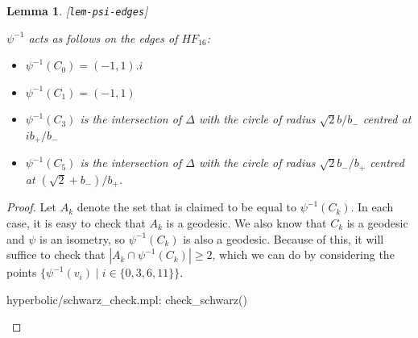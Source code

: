 \documentclass[reqno]{amsart}
\newcommand{\lbl}[1]{\label{#1}\textup{[\texttt{#1}]}\par}
\newcommand{\lbl}{\label}
\newcommand{\Dl}        {\Delta}
\newcommand{\st}        {\;|\;}
\newcommand{\rt}        {\sqrt{2}}
\renewcommand{\:}{\colon}
\newtheorem{lemma}[theorem]{Lemma}
\theoremstyle{definition}
\begin{document}
\begin{lemma}\lbl{lem-psi-edges}
 $\psi^{-1}$ acts as follows on the edges of $HF_{16}$:
 \begin{itemize}
  \item $\psi^{-1}(C_0)=(-1,1).i$
  \item $\psi^{-1}(C_1)=(-1,1)$
  \item $\psi^{-1}(C_3)$ is the intersection of $\Dl$ with the circle
   of radius $\rt b/b_-$ centred at $ib_+/b_-$
  \item $\psi^{-1}(C_5)$ is the intersection of $\Dl$ with the circle
   of radius $\rt b_-/b_+$ centred at $(\rt+b_-)/b_+$.
 \end{itemize}
\end{lemma}
\begin{proof}
 Let $A_k$ denote the set that is claimed to be equal to
 $\psi^{-1}(C_k)$.  In each case, it is easy to check that $A_k$ is a
 geodesic.  We also know that $C_k$ is a geodesic and $\psi$ is an
 isometry, so $\psi^{-1}(C_k)$ is also a geodesic.  Because of this,
 it will suffice to check that $|A_k\cap\psi^{-1}(C_k)|\geq 2$, which
 we can do by considering the points
 $\{\psi^{-1}(v_i)\st i\in\{0,3,6,11\}\}$.
 \begin{checks}
  hyperbolic/schwarz_check.mpl: check_schwarz()
 \end{checks}
\end{proof}
\end{document}
